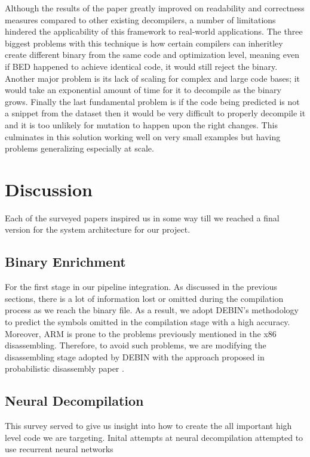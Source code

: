 \documentclass[conference,a4paper]{IEEEtran}
\begin{document}
Although the results of the paper greatly improved on readability and correctness measures compared to other existing decompilers, a number of limitations hindered the applicability of this framework to real-world applications.
The three biggest problems with this technique is how certain compilers can inheritley create different binary from the same code and optimization level, meaning even if BED happened to achieve identical code, it would still reject the binary.
Another major problem is its lack of scaling for complex and large code bases; it would take an exponential amount of time for it to decompile as the binary grows.
Finally the last fundamental problem is if the code being predicted is not a snippet from the dataset then it would be very difficult to properly decompile it and it is too unlikely for mutation to happen upon the right changes.
This culminates in this solution working well on very small examples but having problems generalizing especially at scale.

\section{Discussion}
Each of the surveyed papers inspired us in some way till we reached a final version for the system architecture for our project.

\subsection{Binary Enrichment}
For the first stage in our pipeline integration.
As discussed in the previous sections, there is a lot of information lost or omitted during the compilation process as we reach the binary file.
As a result, we adopt DEBIN's methodology to predict the symbols omitted in the compilation stage with a high accuracy.
Moreover, ARM is prone to the problems previously mentioned in the x86 disassembling.
Therefore, to avoid such problems, we are modifying the disassembling stage adopted by DEBIN with the approach proposed in probabilistic disassembly paper \cite{miller_probabilistic_2019}.

\subsection{Neural Decompilation}
This survey served to give us insight into how to create the all important high level code we are targeting.
Inital attempts at neural decompilation attempted to use recurrent neural networks 

\printbibliography
\end{document}
